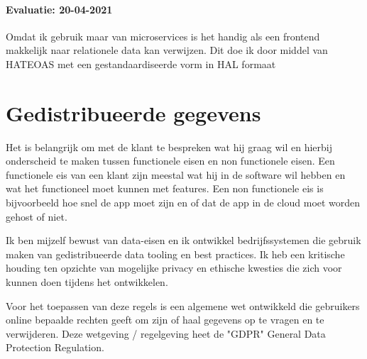\paragraph{Evaluatie: 20-04-2021}
Omdat ik gebruik maar van microservices is het handig als een frontend makkelijk naar relationele data kan verwijzen.
Dit doe ik door middel van HATEOAS met een gestandaardiseerde vorm in HAL formaat





\newpage
\section{Gedistribueerde gegevens}\label{sec:gedistribueerde-gegevens}

Het is belangrijk om met de klant te bespreken wat hij graag wil en hierbij onderscheid te maken tussen functionele
eisen en non functionele eisen.
Een functionele eis van een klant zijn meestal wat hij in de software wil hebben en wat het functioneel moet kunnen met features.
Een non functionele eis is bijvoorbeeld hoe snel de app moet zijn en of dat de app in de cloud moet worden gehost of
niet.

Ik ben mijzelf bewust van data-eisen en ik ontwikkel bedrijfssystemen die gebruik maken van gedistribueerde
data tooling en best practices.
Ik heb een kritische houding ten opzichte van mogelijke privacy en ethische kwesties die zich voor kunnen doen
tijdens het ontwikkelen.

Voor het toepassen van deze regels is een algemene wet ontwikkeld die gebruikers online bepaalde rechten geeft om zijn of haal gegevens op te vragen en te verwijderen.
Deze wetgeving / regelgeving heet de "GDPR" General Data Protection Regulation.

